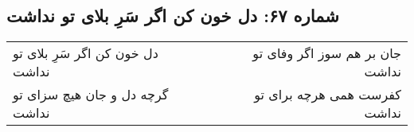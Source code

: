 \begin{center}
\section*{شماره ۶۷: دل خون کن اگر سَرِ بلای تو نداشت}
\label{sec:067}
\begin{longtable}{l p{0.5cm} r}
دل خون کن اگر سَرِ بلای تو نداشت
&&
جان بر هم سوز اگر وفای تو نداشت
\\
گرچه دل و جان هیچ سزای تو نداشت
&&
کفرست همی هرچه برای تو نداشت
\\
\end{longtable}
\end{center}

